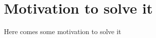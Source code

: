 
\section{Motivation to solve it}\label{sec:motivation-to-solve-it}
Here comes some motivation to solve it

